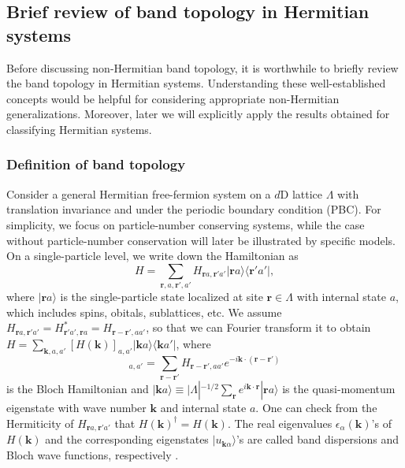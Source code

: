 \documentclass{tADP2e}
\theoremstyle{plain}
\theoremstyle{plain}
\theoremstyle{definition}
\begin{document}
\subsection{Brief review of band topology in Hermitian systems}\label{Sec:5rev}
Before discussing non-Hermitian band topology, it is worthwhile to briefly review the band topology in Hermitian systems. Understanding these well-established concepts would be helpful for considering appropriate non-Hermitian generalizations. Moreover, later we will explicitly apply the results obtained for classifying Hermitian systems. 

\subsubsection{Definition of band topology}\label{Sec:5def}
Consider a general Hermitian free-fermion system on a $d$D lattice $\Lambda$ with translation invariance and under the periodic boundary condition (PBC). For simplicity, we focus on particle-number conserving systems, while the case without particle-number conservation will later be illustrated by specific models. On a single-particle level, we write down the Hamiltonian as
\begin{equation}
H=\sum_{\boldsymbol{r},a,\boldsymbol{r}',a'} H_{\boldsymbol{r}a,\boldsymbol{r}'a'}|\boldsymbol{r}a\rangle\langle \boldsymbol{r}'a'|,
\end{equation} 
where $|\boldsymbol{r}a\rangle$ is the single-particle state localized at site $\boldsymbol{r}\in\Lambda$ with internal state $a$, which includes spins, obitals, sublattices, etc. We assume $H_{\boldsymbol{r}a,\boldsymbol{r}'a'}= H^*_{\boldsymbol{r}'a',\boldsymbol{r}a}=H_{\boldsymbol{r}-\boldsymbol{r}',aa'}$, so that we can Fourier transform it to obtain
$H=\sum_{\boldsymbol{k},a,a'} [H(\boldsymbol{k})]_{a,a'}|\boldsymbol{k}a\rangle\langle\boldsymbol{k}a'|$,
where %
\begin{equation}
[H(\boldsymbol{k})]_{a,a'}=\sum_{\boldsymbol{r}-\boldsymbol{r}'}H_{\boldsymbol{r}-\boldsymbol{r}',aa'}e^{-i\boldsymbol{k}\cdot(\boldsymbol{r}-\boldsymbol{r}')}
\end{equation}
is the Bloch Hamiltonian and $|\boldsymbol{k}a\rangle\equiv |\Lambda|^{-1/2}\sum_{\boldsymbol{r}}e^{i\boldsymbol{k}\cdot\boldsymbol{r}}|\boldsymbol{r}a\rangle$ is the quasi-momentum eigenstate with wave number $\boldsymbol{k}$ and internal state $a$. One can check from the Hermiticity of $H_{\boldsymbol{r}a,\boldsymbol{r}'a'}$ that $H(\boldsymbol{k})^\dag=H(\boldsymbol{k})$. The real eigenvalues $\epsilon_\alpha(\boldsymbol{k})$'s of $H(\boldsymbol{k})$ and the corresponding eigenstates $|u_{\boldsymbol{k}\alpha}\rangle$'s are called band dispersions and Bloch wave functions, respectively \cite{NWA76}.
\end{document}
